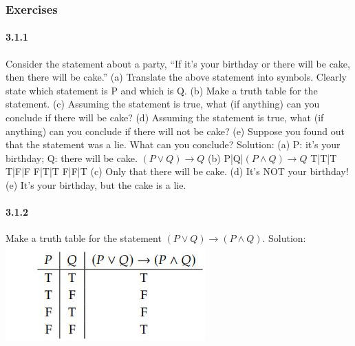 \documentclass{article}
\begin{document}
\subsubsection{Exercises}
\paragraph{3.1.1}
Consider the statement about a party, “If it’s your birthday or there
will be cake, then there will be cake.”\newline
(a) Translate the above statement into symbols. Clearly state which
statement is P and which is Q.\newline
(b) Make a truth table for the statement.\newline
(c) Assuming the statement is true, what (if anything) can you
conclude if there will be cake?\newline
(d) Assuming the statement is true, what (if anything) can you
conclude if there will not be cake?\newline
(e) Suppose you found out that the statement was a lie. What can
you conclude?\newline
Solution:\newline
(a) P: it’s your birthday; Q: there will be cake. $(P \lor Q) \to Q$\newline
(b)\newline
P|Q|$(P \land Q) \to Q$\newline
T|T|T\newline
T|F|F\newline
F|T|T\newline
F|F|T\newline
(c) Only that there will be cake.\newline
(d) It’s NOT your birthday!\newline
(e) It’s your birthday, but the cake is a lie.
\paragraph{3.1.2}
Make a truth table for the statement $(P \lor Q) \to (P \land Q)$.\newline
Solution:\newline
\includegraphics{3.1.2}
\end{document}
